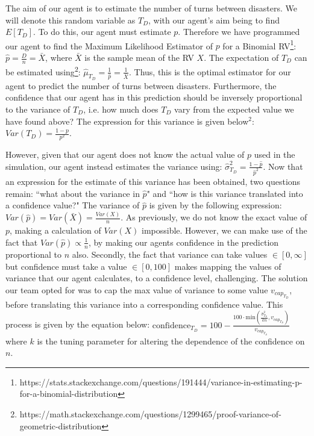 The aim of our agent is to estimate the number of turns between disasters. We will denote this random variable as $T_D$, with our agent's aim being to find $E[T_D]$. To do this, our agent must estimate $p$. Therefore we have programmed our agent to find the Maximum Likelihood Estimator of $p$ for a Binomial RV\footnote{https://stats.stackexchange.com/questions/191444/variance-in-estimating-p-for-a-binomial-distribution}: $\hat{p} = \frac{D}{n} = \bar{X}$, where $\bar{X}$ is the sample mean of the RV $X$. The expectation of $T_D$ can be estimated using\footnote{https://math.stackexchange.com/questions/1299465/proof-variance-of-geometric-distribution}: $\hat{\mu}_{T_D}= \frac{1}{\hat{p}} = \frac{1}{\bar{X}}$. Thus, this is the optimal estimator for our agent to predict the number of turns between disasters. Furthermore, the confidence that our agent has in this prediction should be inversely proportional to the variance of $T_D$, i.e. how much does $T_D$ vary from the expected value we have found above? The expression for this variance is given below$^2$: $Var(T_D)= \frac{1-p}{p^2}$. 

However, given that our agent does not know the actual value of $p$ used in the simulation, our agent instead estimates the variance using: $\hat{\sigma}_{T_D}^2= \frac{1-\hat{p}}{\hat{p}^2}$. Now that an expression for the estimate of this variance has been obtained, two questions remain: ``what about the variance in $\hat{p}$" and ``how is this variance translated into a confidence value?" The variance of $\hat{p}$ is given by the following expression: $Var(\hat{p})= Var(\bar{X}) = \frac{Var(X)}{n}$. As previously, we do not know the exact value of $p$, making a calculation of $Var(X)$ impossible. However, we can make use of the fact that $Var(\hat{p}) \propto \frac{1}{n}$, by making our agents confidence in the prediction proportional to $n$ also. Secondly, the fact that variance can take values $\in [0,\infty]$ but confidence must take a value $\in [0, 100]$ makes mapping the values of variance that our agent calculates, to a confidence level, challenging. The solution our team opted for was to cap the max value of variance to some value $v_{cap_{T_D}}$, before translating this variance into a corresponding confidence value. This process is given by the equation below: $\text{confidence}_{T_D} = 100 - \frac{100 \cdot \text{min}(\frac{\hat{\sigma}_{T_D}^2}{kn}, v_{cap_{T_D}})}{v_{cap_{T_D}}}$ 
where $k$ is the tuning parameter for altering the dependence of the confidence on $n$. 

